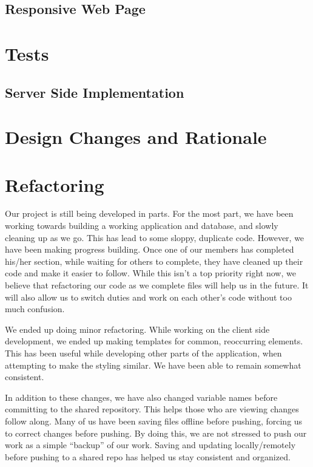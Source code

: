\documentclass[12pt]{article}
\begin{document}
\subsection{Responsive Web Page}

\section{Tests}
\subsection{Server Side Implementation}

\section{Design Changes and Rationale}

\section{Refactoring}

Our project is still being developed in parts. For the most part, we have
been working towards building a working application and database, and slowly
cleaning up as we go. This has lead to some sloppy, duplicate code. However,
we have been making progress building. Once one of our members has completed
his/her section, while waiting for others to complete, they have cleaned up
their code and make it easier to follow. While this isn’t a top priority
right now, we believe that refactoring our code as we complete files will
help us in the future. It will also allow us to switch duties and work on
each other's code without too much confusion.

We ended up doing minor refactoring. While working on the client side
development, we ended up making templates for common, reoccurring elements.
This has been useful while developing other parts of the application, when
attempting to make the styling similar. We have been able to remain somewhat
consistent.

In addition to these changes, we have also changed variable names before
committing to the shared repository. This helps those who are viewing
changes follow along. Many of us have been saving files offline before
pushing, forcing us to correct changes before pushing. By doing this, we are
not stressed to push our work as a simple “backup” of our work. Saving and
updating locally/remotely before pushing to a shared repo has helped us stay
consistent and organized.
\end{document}
